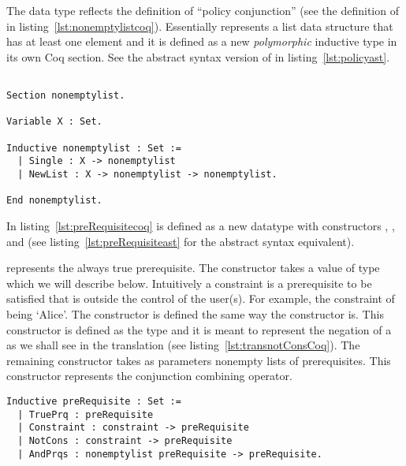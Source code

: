 The data type  reflects the definition of ``policy conjunction'' (see the definition of  in listing~\ref{lst:nonemptylistcoq}). Essentially  represents a list data structure that has at least one element and it is defined as a new \emph{polymorphic} inductive type in its own Coq section. See the abstract syntax version of  in listing~\ref{lst:policyast}. 


\begin{minipage}[c]{0.95\textwidth}
\begin{lstlisting}

Section nonemptylist.

Variable X : Set.

Inductive nonemptylist : Set :=
  | Single : X -> nonemptylist 
  | NewList : X -> nonemptylist -> nonemptylist.

End nonemptylist.
\end{lstlisting}
\end{minipage}


In listing~\ref{lst:preRequisitecoq}  is defined as a new datatype with constructors , ,  and  (see listing~\ref{lst:preRequisiteast} for the abstract syntax equivalent).

 represents the always true prerequisite. The  constructor takes a value of type  which we will describe below. Intuitively a constraint is a prerequisite to be satisfied that is outside the control of the user(s). For example, the constraint of being `Alice'. The constructor  is defined the same way the  constructor is. This constructor is defined as the type  and it is meant to represent the negation of a  as we shall see in the translation (see listing~\ref{lst:transnotConsCoq}). The remaining constructor  takes as parameters nonempty lists of prerequisites. This constructor represents the conjunction combining operator. 


\lstset{language=Coq}
\begin{lstlisting}[frame=single, caption={preRequisite},label={lst:preRequisitecoq}]
Inductive preRequisite : Set :=
  | TruePrq : preRequisite
  | Constraint : constraint -> preRequisite 
  | NotCons : constraint -> preRequisite 
  | AndPrqs : nonemptylist preRequisite -> preRequisite.
  
\end{lstlisting}

